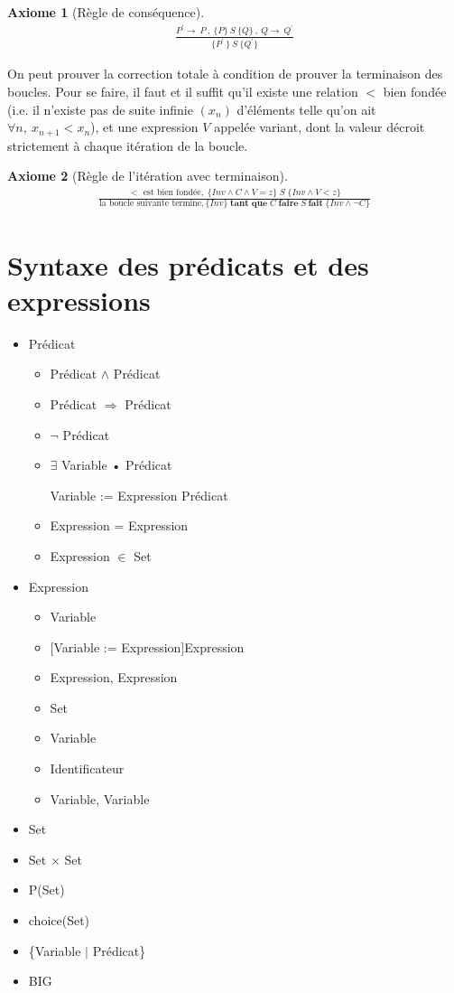 \documentclass[10pt,a4paper]{article}
\newtheorem{axiom}{Axiome}[section]
\begin{document}
{\begin{axiom}[Règle de conséquence]
\begin{align}
\frac { P^\prime \rightarrow\ P\ ,\ \lbrace P \rbrace\ S\ \lbrace Q \rbrace\ ,\ Q \rightarrow\ Q^\prime } { \lbrace P^\prime\ \rbrace\ S\ \lbrace Q^\prime\rbrace }
\end{align}
\end{axiom}

On peut prouver la correction totale à condition de prouver la terminaison des boucles.
Pour se faire, il faut et il suffit qu'il existe une relation $<$ bien fondée (i.e. il n'existe pas de suite infinie $(x_n)$ d'éléments telle qu'on ait $\forall n, \ x_{n+1} < x_n$), et une expression $V$ appelée variant, dont la valeur décroit strictement à chaque itération de la boucle.

\begin{axiom}[Règle de l'itération avec terminaison]
\begin{align}
\frac{< \textrm{\ est\ bien fondée},\;\{Inv \land C \land V=z \}\;S\;\{Inv \land V < z\}} {\textrm{la boucle suivante termine}, \{Inv\}\;\textbf{tant que}\;C\; \textbf{faire}\; S \ \textbf{fait} \;\{Inv \land \lnot C \} }
\end{align}
\end{axiom}

\section{Syntaxe des prédicats et des expressions}
\label{SyntaxPredicatExpression}
\begin{itemize}
\item Prédicat
\begin{itemize}
\item Prédicat $\wedge$ Prédicat
\item Prédicat $\Rightarrow$ Prédicat
\item $\lnot$ Prédicat
\item $\exists$ Variable • Prédicat
\item [Variable := Expression] Prédicat
\item Expression = Expression
\item Expression $\in$ Set
\end{itemize}
\item Expression
\begin{itemize}
\item Variable
\item $[$Variable := Expression$]$Expression
\item Expression, Expression
\item Set
\item Variable
\item Identificateur
\item Variable, Variable
\end{itemize}
\item Set
\item Set $\times$ Set
\item P(Set)
\item choice(Set)
\item \{Variable $|$ Prédicat\}
\item BIG


\end{itemize}}
\end{document}
